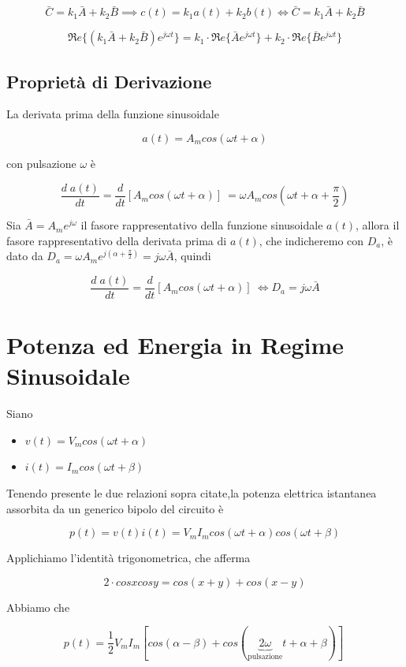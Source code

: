 \documentclass[a4paper]{report}
\begin{document}
\[
\bar{C} = k_1\bar{A}+k_2\bar{B} \implies c(t)=k_1a(t)+k_2b(t)
\Longleftrightarrow \bar{C}=k_1\bar{A}+k_2\bar{B}
\]

\[
\Re e\{(k_1\bar{A}+k_2\bar{B})e^{j\omega t}\} = k_1\cdot \Re e\{\bar{A}e^{j\omega
  t}\}+k_2\cdot \Re e\{\bar{B}e^{j\omega t}\}
\]

\subsection{Propriet\`a di Derivazione}
La derivata prima della funzione sinusoidale

\[
a(t)=A_mcos(\omega t+\alpha)
\]

con pulsazione $\omega$ \`e

\[
\dfrac{d\;a(t)}{dt}=\dfrac{d}{dt}[A_mcos(\omega t+\alpha)]\ = \omega
A_m cos\left(\omega t+\alpha+ \dfrac{\pi}{2}\right)
\]

Sia $\bar{A} = A_me^{j\omega}$ il fasore rappresentativo della
funzione sinusoidale $a(t)$, allora il fasore rappresentativo della
derivata prima di $a(t)$, che indicheremo con $D_a$, \`e dato da $D_a
= \omega A_m e^{j \left(\alpha+ \frac{\pi}{2}\right)} = j\omega
\bar{A}$, quindi

\[
\dfrac {d\;a(t)}{dt}=\dfrac{d}{dt}[A_mcos(\omega
  t+\alpha)]\ \Longleftrightarrow D_a=j\omega \bar{A}
\]

\section{Potenza ed Energia in Regime Sinusoidale}

Siano
\begin{itemize}
\item $v(t)=V_mcos(\omega t+\alpha)$
\item $i(t)=I_mcos(\omega t+\beta)$
\end{itemize}

Tenendo presente le due relazioni sopra citate,la potenza elettrica
istantanea assorbita da un generico bipolo del circuito \`e

\[
p(t)=v(t)i(t)=V_mI_mcos(\omega t+\alpha)cos(\omega t+\beta)
\]

Applichiamo l'identit\`a trigonometrica, che afferma

\[
2\cdot cosxcosy = cos(x+y)+cos(x-y)
\]

Abbiamo che

\[
p(t)=\dfrac{1}{2}V_mI_m[cos(\alpha-\beta)+cos(\underbrace{2\omega}_\text
  {pulsazione} t+\alpha+\beta)]\
\]
\end{document}
